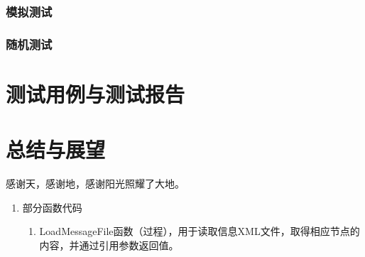 \documentclass[printMode=true, declarePage=false]{ecnuthesis}
\begin{document}
\zhlipsum[12]

\subsection{模拟测试}

\zhlipsum[13]

\subsection{随机测试}

\zhlipsum[14]


\chapter{测试用例与测试报告}

\zhlipsum[15]


\chapter{总结与展望}

\zhlipsum[16]

\backmatter

\begin{acknowledgement}
  感谢天，感谢地，感谢阳光照耀了大地。
\end{acknowledgement}

\PrintReference

\begin{appendix}
  \begin{enumerate}
    \item 部分函数代码
    \begin{enumerate}[label=（\arabic*）]
      \item LoadMessageFile函数（过程），用于读取信息XML文件，取得相应节点的内容，并通过引用参数返回值。
    \end{enumerate}
  \end{enumerate}
\end{appendix}
\end{document}
